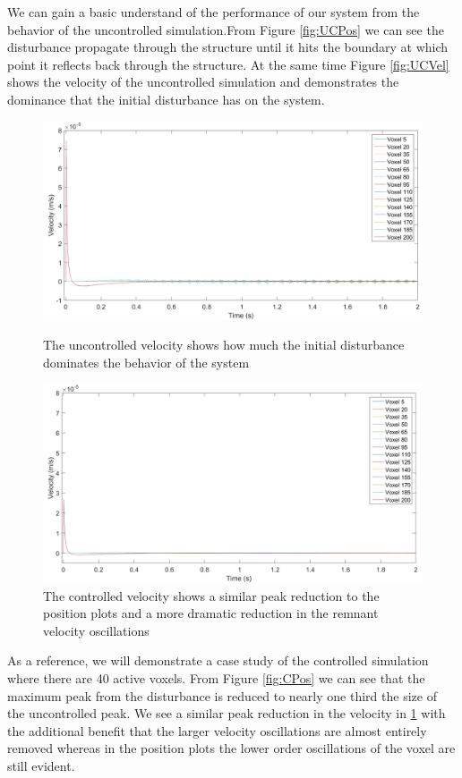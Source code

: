 \documentclass[11pt]{ucthesis}
\begin{document}
We can gain a basic understand of the performance of our system from the behavior of the uncontrolled simulation.From Figure \ref{fig:UCPos} we can see the disturbance propagate through the structure until it hits the boundary at which point it reflects back through the structure. At the same time Figure \ref{fig:UCVel} shows the velocity of the uncontrolled simulation and demonstrates the dominance that the initial disturbance has on the system.

\begin{figure}[h]
\centering
\includegraphics[width=0.8\linewidth]{Figures/UncontrolledVelocity.png}
\caption{The uncontrolled velocity shows how much the initial disturbance dominates the behavior of the system}
\label{fig:UCVel}
\includegraphics[width=0.8\linewidth]{Figures/Velocity40Controlled12_10_2016.png}
\caption{The controlled velocity shows a similar peak reduction to the position plots and a more dramatic reduction in the remnant velocity oscillations}
\label{fig:CVel}
\end{figure}

As a reference, we will demonstrate a case study of the controlled simulation where there are 40 active voxels. From Figure \ref{fig:CPos} we can see that the maximum peak from the disturbance is reduced to nearly one third the size of the uncontrolled peak. We see a similar peak reduction in the velocity in \ref{fig:CVel} with the additional benefit that the larger velocity oscillations are almost entirely removed whereas in the position plots the lower order oscillations of the voxel are still evident.
\end{document}
